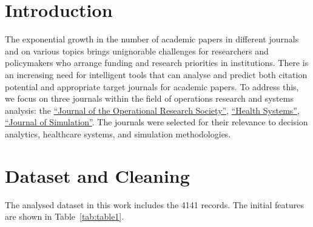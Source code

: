 \documentclass[9pt,twocolumn,twoside]{pnas-new}
\begin{document}


\maketitle
\thispagestyle{firststyle}

\section*{Introduction}

The exponential growth in the number of academic papers in different journals and on various topics brings unignorable challenges for researchers and policymakers who arrange funding and research priorities in institutions\cite{10.1162/qss_a_00327}. There is an increasing need for intelligent tools that can analyse and predict both citation potential and appropriate target journals for academic papers\cite{10.1002/asi.24810}. To address this, we focus on three journals within the field of operations research and systems analysis: the \href{ https://www.tandfonline.com/journals/tjor20}{``Journal of the Operational Research Society''}, \href{ https://www.tandfonline.com/journals/thss20}{``Health Systems''}, \href{https://www.tandfonline.com/journals/tjsm20}{``Journal of Simulation''}. The journals were selected for their relevance to decision analytics, healthcare systems, and simulation methodologies.



\section{Dataset and Cleaning}
The analysed dataset in this work includes the 4141 records. The initial features are shown in Table~\ref{tab:table1}.
\end{document}
